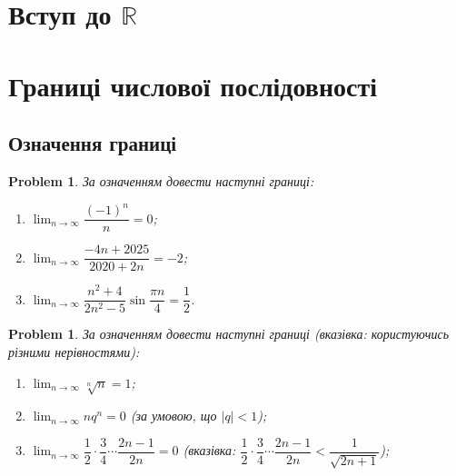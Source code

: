 \documentclass[a4paper, 14pt]{article}
\theoremstyle{theoremdd}
\theoremstyle{theoremdd}
\theoremstyle{theoremdd}
\theoremstyle{theoremdd}
\theoremstyle{theoremdd}
\theoremstyle{theoremdd}
\theoremstyle{theoremdd}
\theoremstyle{theoremdd}
\newtheorem{problem}[theorem]{Problem}
\theoremstyle{theoremdd}
\begin{document}

\tableofcontents
\newpage

\section{Вступ до $\mathbb{R}$}
\newpage

\section{Границі числової послідовності}
\subsection{Означення границі}
\begin{problem}
За означенням довести наступні границі:
\begin{enumerate}[nosep,wide=0pt,label={\arabic*)}]
\item $\displaystyle\lim_{n \to \infty} \dfrac{(-1)^n}{n} = 0$;
\item $\displaystyle\lim_{n \to \infty} \dfrac{-4n+2025}{2020+2n} = -2$;
\item $\displaystyle\lim_{n \to \infty} \dfrac{n^2+4}{2n^2-5} \sin \dfrac{\pi n}{4} = \dfrac{1}{2}$.
\end{enumerate}
\end{problem}

\begin{problem}
За означенням довести наступні границі (вказівка: користуючись різними нерівностями):
\begin{enumerate}[nosep,wide=0pt,label={\arabic*)}]
\item $\displaystyle\lim_{n \to \infty} \sqrt[n]{n} = 1$;
\item $\displaystyle\lim_{n \to \infty} n q^n = 0$ (за умовою, що $|q| < 1$);
\item $\displaystyle\lim_{n \to \infty} \dfrac{1}{2} \cdot \dfrac{3}{4} \cdots \dfrac{2n-1}{2n} = 0$ (вказівка: $\dfrac{1}{2} \cdot \dfrac{3}{4} \cdots \dfrac{2n-1}{2n} < \dfrac{1}{\sqrt{2n+1}}$);
\end{enumerate}
\end{problem}
\end{document}
